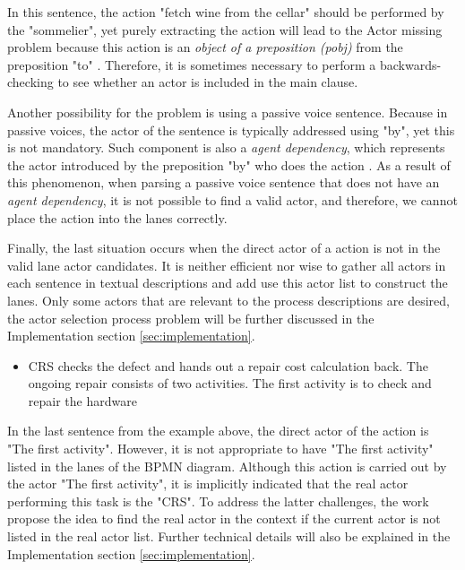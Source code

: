 In this sentence, the action "fetch wine from the cellar" should be performed by the "sommelier", yet purely extracting the action will lead to the Actor missing problem because this action is an \textit{object of a preposition (pobj)} from the preposition "to" \cite{dependencies_manual}. Therefore, it is sometimes necessary to perform a backwards-checking to see whether an actor is included in the main clause. 

Another possibility for the problem is using a passive voice sentence. Because in passive voices, the actor of the sentence is typically addressed using "by", yet this is not mandatory. Such component is also a \textit{agent dependency}, which represents the actor introduced by the preposition "by" who does the action \cite{dependencies_manual}. As a result of this phenomenon, when parsing a passive voice sentence that does not have an \textit{agent dependency}, it is not possible to find a valid actor, and therefore, we cannot place the action into the lanes correctly.

Finally, the last situation occurs when the direct actor of a action is not in the valid lane actor candidates. It is neither efficient nor wise to gather all actors in each sentence in textual descriptions and add use this actor list to construct the lanes. Only some actors that are relevant to the process descriptions are desired, the actor selection process problem will be further discussed in the Implementation section \ref{sec:implementation}.

\begin{itemize}
    \item CRS checks the defect and hands out a repair cost calculation back. The ongoing repair consists of two activities. The first activity is to check and repair the hardware
\end{itemize}

In the last sentence from the example above, the direct actor of the action is "The first activity". However, it is not appropriate to have "The first activity" listed in the lanes of the BPMN diagram. Although this action is carried out by the actor "The first activity", it is implicitly indicated that the real actor performing this task is the "CRS". To address the latter challenges, the work propose the idea to find the real actor in the context if the current actor is not listed in the real actor list. Further technical details will also be explained in the Implementation section \ref{sec:implementation}.



